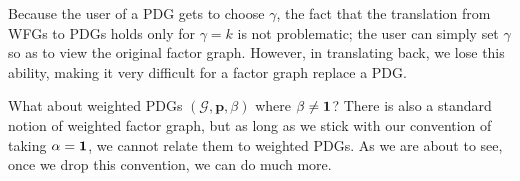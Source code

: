\documentclass[letterpaper]{article} %
\theoremstyle{plain}
\theoremstyle{definition}
\theoremstyle{remark}
\newcommand\mat[1]{\mathbf{#1}}
\newcommand{\Gr}{\mathcal G}
\begin{document}
Because the user of a PDG gets to choose $\gamma$, the fact that the 
translation from WFGs to PDGs holds only for $\gamma=k$ is not problematic; 
the user can simply set $\gamma$ so as to view the original factor graph.
However, in translating back, we lose this ability, making it very difficult for
a factor graph replace a PDG.



What about weighted PDGs $(\Gr, \mat p, \beta)$ where $\beta \ne {\bf 1}$?
There is also a standard notion of weighted factor graph,
but as long as we stick with our convention of taking  $\alpha = {\bf 1}$, 
we cannot relate them to weighted PDGs.  
As we are about to see,
once we drop this convention, we can do much more.
\end{document}

